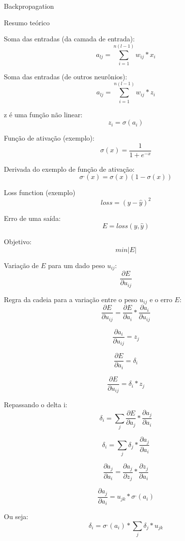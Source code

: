 \documentclass{article}
\begin{document}
\centerline{\sc \large Backpropagation}
\vspace{.5pc}
\centerline{\sc Resumo teórico}
\vspace{4pc}

Soma das entradas (da camada de entrada):
\[ a_{lj} = \sum_{i=1}^{n(l-1)} w_{ij} * x_i \]

Soma das entradas (de outros neurônios):
\[ a_{lj} = \sum_{i=1}^{n(l-1)} w_{ij} * z_i \]

z é uma função não linear:
\[ z_i = \sigma( a_i ) \]

\vspace{4pc}

Função de ativação (exemplo):
\[ \sigma(x) = \frac{1}{1 + e^{-x}} \]

Derivada do exemplo de função de ativação:
\[ \sigma^{,}( x ) = \sigma(x)(1 - \sigma(x)) \]

Loss function (exemplo)
\[ loss = (y - \hat{y})^2 \]

Erro de uma saída:
\[ E = loss(y, \hat{y})  \]

Objetivo:
\[ min \left| E \right| \]

\vspace{4pc}

\noindent Variação de ${E}$ para um dado peso ${u_{ij}}$:
\[ \frac{\partial E}{\partial u_{ij}} \]

Regra da cadeia para a variação entre o peso ${u_{ij}}$ e o erro ${E}$:
\[ \frac{\partial E}{\partial u_{ij}} = \frac{\partial E}{\partial a_i} * \frac{\partial a_i}{\partial u_{ij}} \]

\[ \frac{\partial a_i}{\partial u_{ij}} = z_j \]

\[ \frac{\partial E}{\partial a_i} = \delta_i \]

\[ \frac{\partial E}{\partial u_{ij}} = \delta_i * z_j \]

Repassando o delta i:
\[ \delta_i = \sum_j \frac{\partial E}{\partial a_j} * \frac{\partial a_j}{\partial a_i} \]

\[ \delta_i = \sum_j \delta_j * \frac{\partial a_j}{\partial a_i} \]

\[ \frac{\partial a_j}{\partial a_i} = \frac{\partial a_j}{\partial z_j} * \frac{\partial z_j}{\partial a_i} \]

\[ \frac{\partial a_j}{\partial a_i} = u_{jk} * \sigma^{,}(a_i) \]

Ou seja:
\[ \delta_i = \sigma^{,}(a_i) * \sum_j \delta_j * u_{jk} \]


\vspace{4pc}
\end{document}
